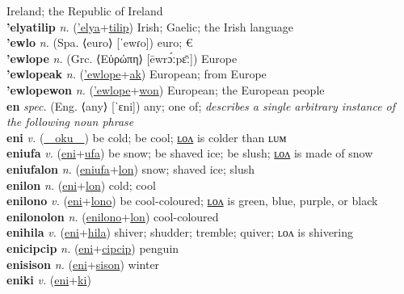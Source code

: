 Ireland; the Republic of Ireland \label{'elyatec} \\
\textbf{'elyatilip} \textit{n.} (\hyperref['elya]{'elya}+\hyperref[tilip]{tilip})
Irish; Gaelic; the Irish language \label{'elyatilip} \\
\textbf{'ewlo} \textit{n.} (Spa. ⟨euro⟩ [ˈewɾo])
euro; € \label{'ewlo} \\
\textbf{'ewlope} \textit{n.} (Grc. ⟨Εὐρώπη⟩ [ēwrɔ́ːpɛ̄ː])
Europe \label{'ewlope} \\
\textbf{'ewlopeak} \textit{n.} (\hyperref['ewlope]{'ewlope}+\hyperref[ak]{ak})
European; from Europe \label{'ewlopeak} \\
\textbf{'ewlopewon} \textit{n.} (\hyperref['ewlope]{'ewlope}+\hyperref[won]{won})
European; the European people \label{'ewlopewon} \\
\textbf{en} \textit{spec.} (Eng. ⟨any⟩ [ˈɛni])
any; one of; \textit{describes a single arbitrary instance of the following noun phrase} \label{en} \\
\textbf{eni} \textit{v.} (\hyperref[oku]{~~oku~~})
be cold; be cool; \hyperref[enilon]{ʟᴏᴧ} is colder than ʟᴜᴍ \label{eni} \\
\textbf{eniufa} \textit{v.} (\hyperref[eni]{eni}+\hyperref[ufa]{ufa})
be snow; be shaved ice; be slush; \hyperref[eniufalon]{ʟᴏᴧ} is made of snow \label{eniufa} \\
\textbf{eniufalon} \textit{n.} (\hyperref[eniufa]{eniufa}+\hyperref[lon]{lon})
snow; shaved ice; slush \label{eniufalon} \\
\textbf{enilon} \textit{n.} (\hyperref[eni]{eni}+\hyperref[lon]{lon})
cold; cool \label{enilon} \\
\textbf{enilono} \textit{v.} (\hyperref[eni]{eni}+\hyperref[lono]{lono})
be cool-coloured; \hyperref[enilonolon]{ʟᴏᴧ} is green, blue, purple, or black \label{enilono} \\
\textbf{enilonolon} \textit{n.} (\hyperref[enilono]{enilono}+\hyperref[lon]{lon})
cool-coloured \label{enilonolon} \\
\textbf{enihila} \textit{v.} (\hyperref[eni]{eni}+\hyperref[hila]{hila})
shiver; shudder; tremble; quiver; ʟᴏᴧ is shivering \label{enihila} \\
\textbf{enicipcip} \textit{n.} (\hyperref[eni]{eni}+\hyperref[cipcip]{cipcip})
penguin \label{enicipcip} \\
\textbf{enisison} \textit{n.} (\hyperref[eni]{eni}+\hyperref[sison]{sison})
winter \label{enisison} \\
\textbf{eniki} \textit{v.} (\hyperref[eni]{eni}+\hyperref[ki]{ki})
